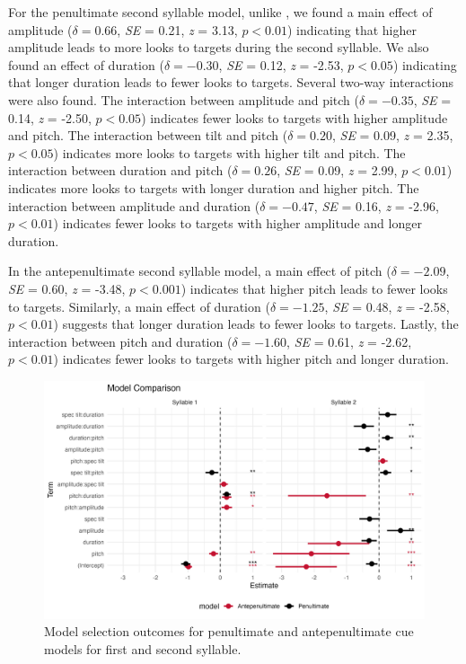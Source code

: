 For the penultimate second syllable model, unlike \cite{Sulpizio_McQueen_2012}, we found a main effect of amplitude ($\delta = 0.66$, \textit{SE} = 0.21, \textit{z} = 3.13, $p < 0.01$) indicating that higher amplitude leads to more looks to targets during the second syllable. We also found an effect of duration ($\delta = -0.30$, \textit{SE} = 0.12, \textit{z} = -2.53, $p < 0.05$) indicating that longer duration leads to fewer looks to targets. Several two-way interactions were also found. The interaction between amplitude and pitch ($\delta = -0.35$, \textit{SE} = 0.14, \textit{z} = -2.50, $p < 0.05$) indicates fewer looks to targets with higher amplitude and pitch. The interaction between tilt and pitch ($\delta = 0.20$, \textit{SE} = 0.09, \textit{z} = 2.35, $p < 0.05$) indicates more looks to targets with higher tilt and pitch. The interaction between duration and pitch ($\delta = 0.26$, \textit{SE} = 0.09, \textit{z} = 2.99, $p < 0.01$) indicates more looks to targets with longer duration and higher pitch. The interaction between amplitude and duration ($\delta = -0.47$, \textit{SE} = 0.16, \textit{z} = -2.96, $p < 0.01$) indicates fewer looks to targets with higher amplitude and longer duration.

In the antepenultimate second syllable model, a main effect of pitch ($\delta = -2.09$, \textit{SE} = 0.60, \textit{z} = -3.48, $p < 0.001$) indicates that higher pitch leads to fewer looks to targets. Similarly, a main effect of duration ($\delta = -1.25$, \textit{SE} = 0.48, \textit{z} = -2.58, $p < 0.01$) suggests that longer duration leads to fewer looks to targets. Lastly, the interaction between pitch and duration ($\delta = -1.60$, \textit{SE} = 0.61, \textit{z} = -2.62, $p < 0.01$) indicates fewer looks to targets with higher pitch and longer duration.

\begin{figure}[H]
  \centering
  \includegraphics[width=1\linewidth]{visuals/analysis_3_plot.jpeg} %
  \caption{Model selection outcomes for penultimate and antepenultimate cue models for first and second syllable.}
  \label{fig:analysis_3_plot }
\end{figure}

